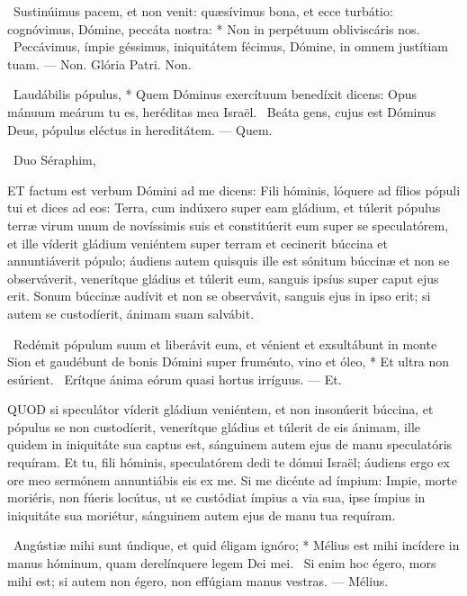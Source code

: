 \R\ Sustinúimus pacem, et non venit: quæsívimus bona, et ecce turbátio: cognóvimus, Dómine, peccáta nostra: * Non in perpétuum obliviscáris nos. \V\ Peccávimus, ímpie géssimus, iniquitátem fécimus, Dómine, in omnem justítiam tuam. — Non. Glória Patri. Non.

\R\ Laudábilis pópulus, * Quem Dóminus exercítuum benedíxit dicens: Opus mánuum meárum tu es, heréditas mea Israël. \V\ Beáta gens, cujus est Dóminus Deus, pópulus eléctus in hereditátem. — Quem.

\R\ Duo Séraphim, 




\lettrine[lines=2]{E}{T} factum est verbum Dómini ad me dicens: Fili hóminis, lóquere ad fílios pópuli tui et dices ad eos: Terra, cum indúxero super eam gládium, et túlerit pópulus terræ virum unum de novíssimis suis et constitúerit eum super se speculatórem, et ille víderit gládium veniéntem super terram et cecinerit búccina et annuntiáverit pópulo; áudiens autem quisquis ille est sónitum búccinæ et non se observáverit, venerítque gládius et túlerit eum, sanguis ipsíus super caput ejus erit. Sonum búccinæ audívit et non se observávit, sanguis ejus in ipso erit; si autem se custodíerit, ánimam suam salvábit.

\R\ Redémit pópulum suum et liberávit eum, et vénient et exsultábunt in monte Sion et gaudébunt de bonis Dómini super fruménto, vino et óleo, * Et ultra non esúrient. \V\ Erítque ánima eórum quasi hortus irríguus. — Et.


\lettrine[lines=2]{Q}{UOD} si speculátor víderit gládium veniéntem, et non insonúerit búccina, et pópulus se non custodíerit, venerítque gládius et túlerit de eis ánimam, ille quidem in iniquitáte sua captus est, sánguinem autem ejus de manu speculatóris requíram. Et tu, fili hóminis, speculatórem dedi te dómui Israël; áudiens ergo ex ore meo sermónem annuntiábis eis ex me. Si me dicénte ad ímpium: Impie, morte moriéris, non fúeris locútus, ut se custódiat ímpius a via sua, ipse ímpius in iniquitáte sua moriétur, sánguinem autem ejus de manu tua requíram.

\R\ Angústiæ mihi sunt úndique, et quid éligam ignóro; * Mélius est mihi incídere in manus hóminum, quam derelínquere legem Dei mei. \V\ Si enim hoc égero, mors mihi est; si autem non égero, non effúgiam manus vestras. — Mélius.

